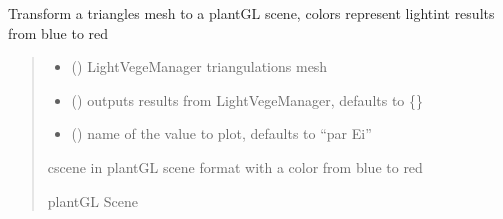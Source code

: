 \documentclass[letterpaper,10pt,english]{sphinxmanual}
\begin{document}

\begin{fulllineitems}
\label{\detokenize{reference:plantGL.cscene_to_plantGLScene_light}}
\pysigstartsignatures
{}
\pysigstopsignatures
\sphinxAtStartPar
Transform a triangles mesh to a plantGL scene, colors represent lightint results 
from blue to red
\begin{quote}\begin{description}
\begin{itemize}
\item {} 
\sphinxAtStartPar
{} () \textendash{} LightVegeManager triangulations mesh

\item {} 
\sphinxAtStartPar
{} (\sphinxstyleliteralemphasis{\sphinxupquote{, }}) \textendash{} outputs results from LightVegeManager, defaults to \{\}

\item {} 
\sphinxAtStartPar
{} (\sphinxstyleliteralemphasis{\sphinxupquote{, }}) \textendash{} name of the value to plot, defaults to “par Ei”

\end{itemize}

\sphinxAtStartPar
cscene in plantGL scene format with a color from blue to red

\sphinxAtStartPar
plantGL Scene

\end{description}\end{quote}

\end{fulllineitems}
\end{document}
